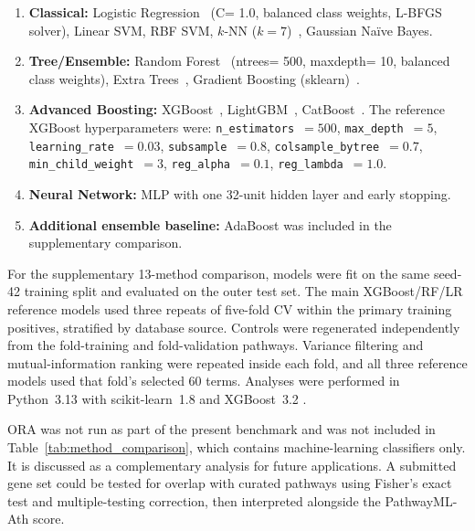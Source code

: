 \documentclass[12pt,letterpaper,oneside,openany]{book}
\begin{document}
\begin{enumerate}[leftmargin=1.5em,label=\arabic*.]
\item \textbf{Classical:} Logistic Regression~\citep{pedregosa2011scikit} (C= 1.0, balanced class weights, L-BFGS solver),
Linear SVM, RBF SVM, $k$-NN ($k=7$)~\citep{cover1967nearest}, Gaussian Na\"{i}ve Bayes.
\item \textbf{Tree/Ensemble:} Random Forest~\citep{breiman2001random} (ntrees= 500, maxdepth= 10, balanced class weights),
Extra Trees~\citep{geurts2006extremely},
Gradient Boosting (sklearn)~\citep{friedman2001greedy}.
\item \textbf{Advanced Boosting:} XGBoost~\citep{chen2016xgboost},
LightGBM~\citep{ke2017lightgbm}, CatBoost~\citep{prokhorenkova2018catboost}. The reference XGBoost hyperparameters were:
\texttt{n\_estimators}~$= 500$, \texttt{max\_depth}~$= 5$,
\texttt{learning\_rate}~$= 0.03$, \texttt{subsample}~$= 0.8$,
\texttt{colsample\_bytree}~$= 0.7$, \texttt{min\_child\_weight}~$= 3$,
\texttt{reg\_alpha}~$= 0.1$, \texttt{reg\_lambda}~$= 1.0$.

\item \textbf{Neural Network:} MLP with one 32-unit hidden layer and early stopping.
\item \textbf{Additional ensemble baseline:} AdaBoost was included in the supplementary comparison.
\end{enumerate}

For the supplementary 13-method comparison, models were fit on the same seed-42 training split and evaluated on the outer test set. The main XGBoost/RF/LR reference models used three repeats of five-fold CV within the primary training positives, stratified by database source. Controls were regenerated independently from the fold-training and fold-validation pathways. Variance filtering and mutual-information ranking were repeated inside each fold, and all three reference models used that fold's selected 60 terms. Analyses were performed in Python~3.13 with scikit-learn~1.8 \citep{pedregosa2011scikit} and XGBoost~3.2 \citep{chen2016xgboost}.

ORA was not run as part of the present benchmark and was not included in Table~\ref{tab:method_comparison}, which contains machine-learning classifiers only. It is discussed as a complementary analysis for future applications. A submitted gene set could be tested for overlap with curated pathways using Fisher's exact test and multiple-testing correction, then interpreted alongside the PathwayML-Ath score.
\end{document}
